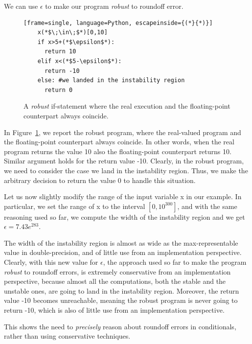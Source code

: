 We can use $\epsilon$ to make our program \emph{robust} to roundoff error.
%
\begin{figure}[tb!]
	\begin{lstlisting}[frame=single, language=Python, escapeinside={(*}{*)}]
	x(*$\;\in\;$*)[0,10]
	if x>5+(*$\epsilon$*):
	  return 10
	elif x<(*$5-\epsilon$*):
	  return -10
	else: #we landed in the instability region
	  return 0
	\end{lstlisting}
	\caption{A \emph{robust} if-statement where the real execution and the floating-point counterpart always coincide.}\label{fig:ifrobust}
\end{figure}
%
In Figure~\ref{fig:ifrobust}, we report the robust program, where the real-valued program and the floating-point counterpart always coincide. 
%
In other words, when the real program returns the value 10 also the floating-point counterpart returns 10. Similar argument holds for the return value -10.
%
Clearly, in the robust program, we need to consider the case we land in the instability region. Thus, we make the arbitrary decision to return the value $0$ to handle this situation.

%

Let us now slightly modify the range of the input variable x in our example. 
%
In particular, we set the range of x to the interval $[0, 10^{300}]$, and with the same reasoning used so far, we compute the width of the instability region and we get $\epsilon=7.43e^{283}$.
%

The width of the instability region is almost as wide as the max-representable value in double-precision, and of little use from an implementation perspective. 
%
Clearly, with this new value for $\epsilon$, the approach used so far to make the program \emph{robust} to roundoff errors, is extremely conservative from an implementation perspective, because almost all the computations, both the stable and the unstable ones, are going to land in the instability region.
%
Moreover, the return value -10 becomes unreachable, meaning the robust program is never going to return -10, which is also of little use from an implementation perspective.
%
%

This shows the need to \emph{precisely} reason about roundoff errors in conditionals, rather than using conservative techniques.
%
